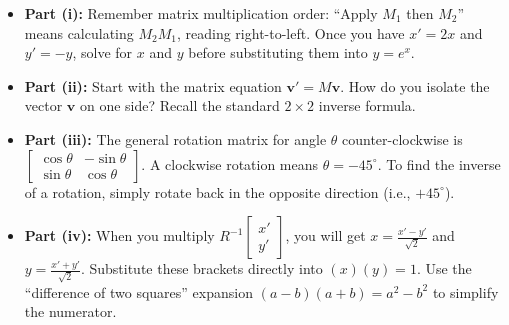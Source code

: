 \begin{hint}
\begin{itemize}
    \item \textbf{Part (i):} Remember matrix multiplication order: ``Apply $M_1$ then $M_2$'' means calculating $M_2 M_1$, reading right-to-left. Once you have $x' = 2x$ and $y' = -y$, solve for $x$ and $y$ before substituting them into $y = e^x$.
    \item \textbf{Part (ii):} Start with the matrix equation $\mathbf{v}' = M \mathbf{v}$. How do you isolate the vector $\mathbf{v}$ on one side? Recall the standard $2 \times 2$ inverse formula.
    \item \textbf{Part (iii):} The general rotation matrix for angle $\theta$ counter-clockwise is $\begin{bmatrix} \cos\theta & -\sin\theta \\ \sin\theta & \cos\theta \end{bmatrix}$. A clockwise rotation means $\theta = -45^\circ$. To find the inverse of a rotation, simply rotate back in the opposite direction (i.e., $+45^\circ$).
    \item \textbf{Part (iv):} When you multiply $R^{-1} \begin{bmatrix} x' \\ y' \end{bmatrix}$, you will get $x = \frac{x' - y'}{\sqrt{2}}$ and $y = \frac{x' + y'}{\sqrt{2}}$. Substitute these brackets directly into $(x)(y) = 1$. Use the ``difference of two squares'' expansion $(a-b)(a+b) = a^2 - b^2$ to simplify the numerator.
\end{itemize}
\end{hint}

